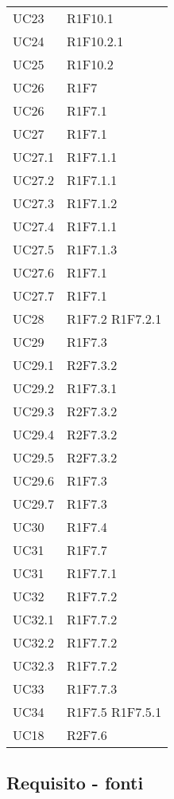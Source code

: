 {\begin{longtable}{C{4cm} C{11.5cm}}
UC23 & R1F10.1 \\
UC24 & R1F10.2.1 \\
UC25 & R1F10.2 \\

UC26 & R1F7 \\

UC26 & R1F7.1 \\
UC27 & R1F7.1 \\
UC27.1 & R1F7.1.1 \\
UC27.2 & R1F7.1.1 \\
UC27.3 & R1F7.1.2 \\
UC27.4 & R1F7.1.1 \\
UC27.5 & R1F7.1.3 \\
UC27.6 & R1F7.1 \\
UC27.7 & R1F7.1 \\
UC28 & R1F7.2 \quad R1F7.2.1 \\
UC29 & R1F7.3 \\
UC29.1 & R2F7.3.2 \\
UC29.2 & R1F7.3.1 \\
UC29.3 & R2F7.3.2 \\
UC29.4 & R2F7.3.2 \\
UC29.5 & R2F7.3.2 \\
UC29.6 & R1F7.3 \\
UC29.7 & R1F7.3 \\
UC30 & R1F7.4 \\
UC31 & R1F7.7 \\
UC31 & R1F7.7.1 \\
UC32 & R1F7.7.2 \\
UC32.1 & R1F7.7.2 \\
UC32.2 & R1F7.7.2 \\
UC32.3 & R1F7.7.2 \\
UC33 & R1F7.7.3 \\
UC34 & R1F7.5 \quad R1F7.5.1\\
UC18 & R2F7.6 \\


\end{longtable}

}

\subsection{Requisito - fonti}


